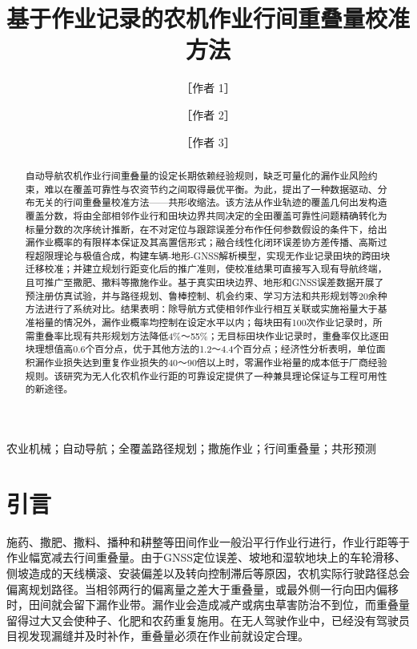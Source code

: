 \documentclass[preprint,12pt,number,sort&compress]{elsarticle}
\begin{document}
\begin{frontmatter}
\title{基于作业记录的农机作业行间重叠量校准方法}
\author[a]{［作者 1］}
\author[b]{［作者 2］}
\author[a]{［作者 3］}
\begin{abstract}
\setlength{\parindent}{2em}\indent 自动导航农机作业行间重叠量的设定长期依赖经验规则，缺乏可量化的漏作业风险约束，难以在覆盖可靠性与农资节约之间取得最优平衡。为此，提出了一种数据驱动、分布无关的行间重叠量校准方法------共形收缩法。该方法从作业轨迹的覆盖几何出发构造覆盖分数，将由全部相邻作业行和田块边界共同决定的全田覆盖可靠性问题精确转化为标量分数的次序统计推断，在不对定位与跟踪误差分布作任何参数假设的条件下，给出漏作业概率的有限样本保证及其高置信形式；融合线性化闭环误差协方差传播、高斯过程超限理论与极值合成，构建车辆-地形-GNSS解析模型，实现无作业记录田块的跨田块迁移校准；并建立规划行距变化后的推广准则，使校准结果可直接写入现有导航终端，且可推广至撒肥、撒料等撒施作业。基于真实田块边界、地形和GNSS误差数据开展了预注册仿真试验，并与路径规划、鲁棒控制、机会约束、学习方法和共形规划等20余种方法进行了系统对比。结果表明：除导航方式使相邻作业行相互关联或实施裕量大于基准裕量的情况外，漏作业概率均控制在设定水平以内；每块田有100次作业记录时，所需重叠率比现有共形规划方法降低4\%～55\%；无目标田块作业记录时，重叠率仅比逐田块理想值高0.6个百分点，优于其他方法的1.2～4.4个百分点；经济性分析表明，单位面积漏作业损失达到重复作业损失的40～90倍以上时，零漏作业裕量的成本低于厂商经验规则。该研究为无人化农机作业行距的可靠设定提供了一种兼具理论保证与工程可用性的新途径。
\end{abstract}
\begin{keyword}
农业机械；自动导航；全覆盖路径规划；撒施作业；行间重叠量；共形预测
\end{keyword}
\end{frontmatter}

\section{引言}

施药、撒肥、撒料、播种和耕整等田间作业一般沿平行作业行进行，作业行距等于作业幅宽减去行间重叠量。由于GNSS定位误差、坡地和湿软地块上的车轮滑移、侧坡造成的天线横滚、安装偏差以及转向控制滞后等原因，农机实际行驶路径总会偏离规划路径。当相邻两行的偏离量之差大于重叠量，或最外侧一行向田内偏移时，田间就会留下漏作业带。漏作业会造成减产或病虫草害防治不到位，而重叠量留得过大又会使种子、化肥和农药重复施用\citep{fao2025,zhang2015,zhang2021}。在无人驾驶作业中，已经没有驾驶员目视发现漏缝并及时补作，重叠量必须在作业前就设定合理。
\end{document}
